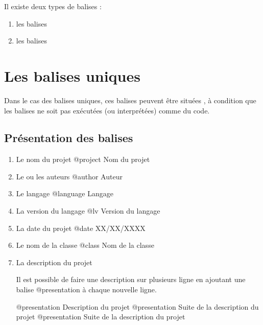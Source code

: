 Il existe deux types de balises : 


\begin{enumerate}
    \item les balises 
    \item les balises 
\end{enumerate}


\chapter{Les balises uniques}

Dans le cas des balises uniques, ces balises peuvent être situées , à condition que les balises ne soit pas exécutées (ou interprétées) comme du code.

\section{Présentation des balises}

\begin{enumerate}
    \item 
    \begin{Bash}{Le nom du projet }
    @project Nom du projet
    \end{Bash}
    
    \item 
    \begin{Bash}{Le ou les auteurs}
    @author Auteur
    \end{Bash}

    \item 
    \begin{Bash}{Le langage}
    @language Langage
    \end{Bash}
    
    \item 
    \begin{Bash}{La version du langage}
    @lv Version du langage
    \end{Bash}
    
    \item 
    \begin{Bash}{La date du projet}
    @date XX/XX/XXXX
    \end{Bash}
    
    \item 
    \begin{Bash}{Le nom de la classe}
    @class Nom de la classe
    \end{Bash}
    
    \item La description du projet \newline
    
    Il est possible de faire une description sur plusieurs ligne en ajoutant une balise @presentation à chaque nouvelle ligne.
    \begin{Bash}
    @presentation Description du projet
    @presentation Suite de la description du projet
    @presentation Suite de la description du projet
    \end{Bash}
  
\end{enumerate}


